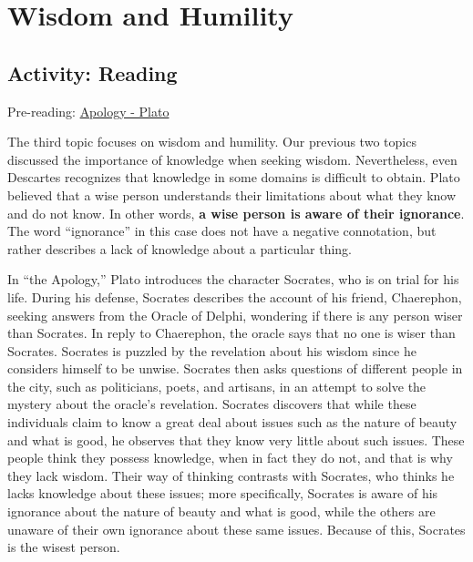 \documentclass[
]{book}
\begin{document}
\hypertarget{wisdom-and-humility}{%
\section{Wisdom and Humility}\label{wisdom-and-humility}}

\hypertarget{activity-reading-2}{%
\subsection*{Activity: Reading}\label{activity-reading-2}}

\begin{reflect}
Pre-reading: \href{http://classics.mit.edu/Plato/apology.html}{Apology - Plato}
\end{reflect}

The third topic focuses on wisdom and humility. Our previous two topics discussed the importance of knowledge when seeking wisdom. Nevertheless, even Descartes recognizes that knowledge in some domains is difficult to obtain. Plato believed that a wise person understands their limitations about what they know and do not know. In other words, \textbf{a wise person is aware of their ignorance}. The word ``ignorance'' in this case does not have a negative connotation, but rather describes a lack of knowledge about a particular thing.

In ``the Apology,'' Plato introduces the character Socrates, who is on trial for his life. During his defense, Socrates describes the account of his friend, Chaerephon, seeking answers from the Oracle of Delphi, wondering if there is any person wiser than Socrates. In reply to Chaerephon, the oracle says that no one is wiser than Socrates. Socrates is puzzled by the revelation about his wisdom since he considers himself to be unwise. Socrates then asks questions of different people in the city, such as politicians, poets, and artisans, in an attempt to solve the mystery about the oracle's revelation. Socrates discovers that while these individuals claim to know a great deal about issues such as the nature of beauty and what is good, he observes that they know very little about such issues. These people think they possess knowledge, when in fact they do not, and that is why they lack wisdom. Their way of thinking contrasts with Socrates, who thinks he lacks knowledge about these issues; more specifically, Socrates is aware of his ignorance about the nature of beauty and what is good, while the others are unaware of their own ignorance about these same issues. Because of this, Socrates is the wisest person.
\end{document}
